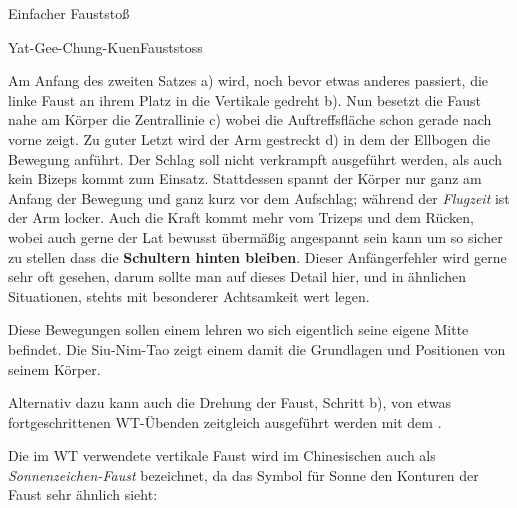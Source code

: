 
\begin{WTSatz}{Einfacher Fauststo{\ss}}%
	
	
	\begin{WTSatzTeil}{Yat-Gee-Chung-Kuen}{Fauststoss}
		
		Am Anfang des zweiten Satzes a) wird, noch bevor etwas anderes passiert, die linke Faust an ihrem Platz in die Vertikale gedreht b). Nun besetzt die Faust nahe am K\"orper die Zentrallinie c) wobei die Auftreffsfl\"ache schon gerade nach vorne zeigt. Zu guter Letzt wird der Arm gestreckt d) in dem der Ellbogen die Bewegung anf\"uhrt. Der Schlag soll nicht verkrampft ausgef\"uhrt werden, als auch kein Bizeps kommt zum Einsatz. Stattdessen spannt der K\"orper nur ganz am Anfang der Bewegung und ganz kurz vor dem Aufschlag; w\"ahrend der \textit{Flugzeit} ist der Arm locker. Auch die Kraft kommt mehr vom Trizeps und dem R\"ucken, wobei auch gerne der Lat bewusst \"uberm\"a{\ss}ig angespannt sein kann um so sicher zu stellen dass die \textbf{Schultern hinten bleiben}. Dieser Anf\"angerfehler wird gerne sehr oft gesehen, darum sollte man auf dieses Detail hier, und in \"ahnlichen Situationen, stehts mit besonderer Achtsamkeit wert legen.
		
		Diese Bewegungen sollen einem lehren wo sich eigentlich seine eigene Mitte befindet. Die Siu-Nim-Tao zeigt einem damit die Grundlagen und Positionen von seinem K\"orper.
		
		Alternativ dazu kann auch die Drehung der Faust, Schritt b), von etwas fortgeschrittenen WT-\"Ubenden zeitgleich ausgef\"uhrt werden mit dem .
		
	\begin{WTCommonBegriff}
		Die im WT verwendete vertikale Faust wird im Chinesischen auch als \textit{Sonnenzeichen-Faust} bezeichnet, da das Symbol f\"ur Sonne den Konturen der Faust sehr \"ahnlich sieht:
		
		\flushleft
		

\end{WTCommonBegriff}
\end{WTSatzTeil}
\end{WTSatz}
